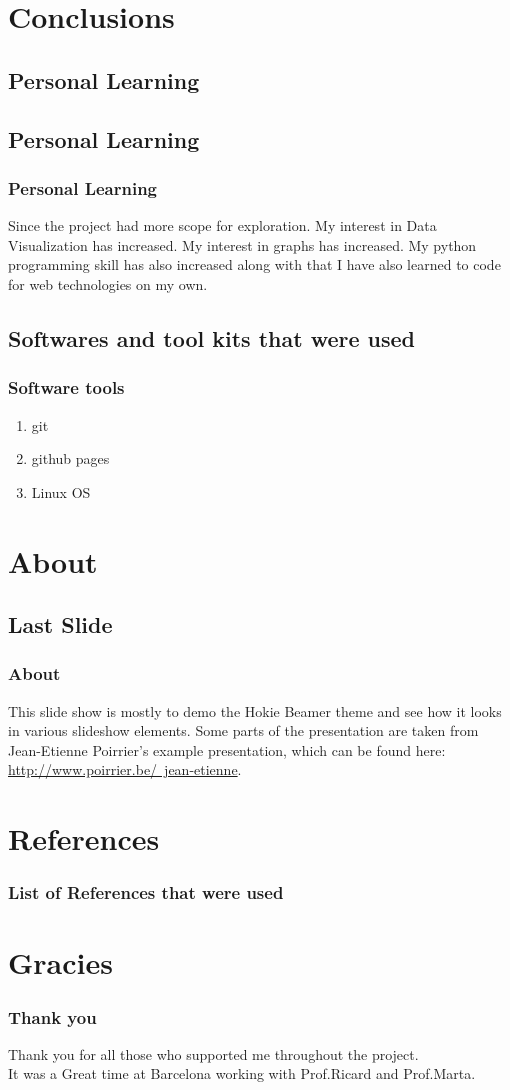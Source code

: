 \documentclass{beamer}
\begin{document}
\section{Conclusions}
\subsection{Personal Learning}


\subsection{Personal Learning}

\frame
{
	\frametitle{Personal Learning}
Since the project had more scope for exploration.
My interest in Data Visualization has increased.
My interest in graphs has increased.
My python programming skill has also increased along with that I have also learned to code for web technologies on my own.
}

\subsection{Softwares and tool kits that were used}

\frame
{
	\frametitle{Software tools}
	\begin{enumerate}
		\item git
		\item github pages
		\item Linux OS
	\end{enumerate}
}


\section{About}
\subsection{Last Slide}

\frame
{
	\frametitle{About}

	This slide show is mostly to demo the Hokie Beamer theme and see how it looks in various slideshow elements.  Some parts of the presentation are taken from Jean-Etienne Poirrier's example presentation, which can be found here:  \href{http://www.poirrier.be/~jean-etienne}{http://www.poirrier.be/~jean-etienne}.
	
	

{}
}

\section{References}

\frame
{
	\frametitle{List of References that were used}


{}
}
\section{Gracies}

\frame
{
	\frametitle{Thank you}
Thank you for all those who supported me throughout the project.\\
It was a Great time at Barcelona working with Prof.Ricard and Prof.Marta.

{}
}
\end{document}
